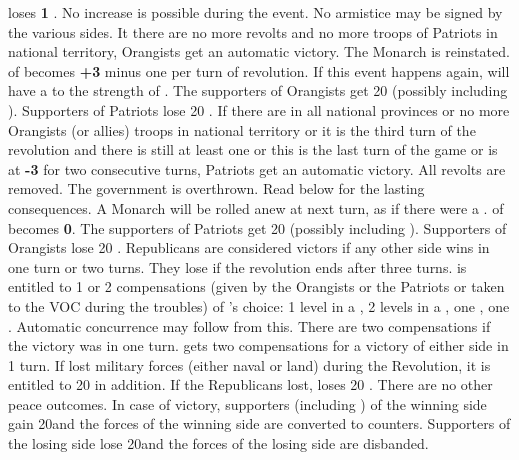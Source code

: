 \phpaix
\aparag \HOL loses {\bf 1} \STAB. No \STAB increase is possible during the
event.
\aparag No armistice may be signed by the various sides.
 It there are no more revolts and no more troops
of Patriots in national territory, Orangists get an automatic victory.
\bparag The Monarch is reinstated. \STAB of \HOL becomes {\bf +3} minus one
per turn of revolution.
\bparag If this event happens again, \HOL will have a  to the
strength of \REVOLT.
\bparag The supporters of Orangists get 20 \VP (possibly including \HOL).
Supporters of Patriots lose 20 \VP.
 If there are \REVOLT in all national provinces or
no more Orangists (or allies) troops in national territory or it is the third
turn of the revolution and there is still at least one \REVOLT or this is the
last turn of the game or \STAB is at {\bf -3} for two consecutive turns,
Patriots get an automatic victory.
\bparag All revolts are removed. The government is overthrown. Read below for
the lasting consequences.
\bparag A Monarch will be rolled anew at next turn, as if there were a
.
\bparag \STAB of \HOL becomes {\bf 0}.
\bparag The supporters of Patriots get 20 \VP (possibly including
\HOL). Supporters of Orangists lose 20 \VP.
 Republicans are considered victors if any
other side wins in one turn or two turns. They lose if the revolution ends
after three turns.
\bparag \ENG is entitled to 1 or 2 compensations (given by the Orangists or
the Patriots or taken to the VOC during the troubles) of \HOL's choice: 1
level in a \CTZ, 2 levels in a \STZ, one \COL, one \TP. Automatic concurrence
may follow from this. There are two compensations if the victory was in one
turn. \ENG gets two compensations for a victory of either side in 1 turn.
\bparag If \ENG lost military forces (either naval or land) during the
Revolution, it is entitled to 20 \VP in addition. If the Republicans lost,
\ENG loses 20 \VP.
\aparag There are no other peace outcomes.
\aparag In case of victory, supporters (including \HOL) of the winning side
gain 20\VP and the forces of the winning side are converted to \HOL
counters. Supporters of the losing side lose 20\VP and the forces of the
losing side are disbanded.

